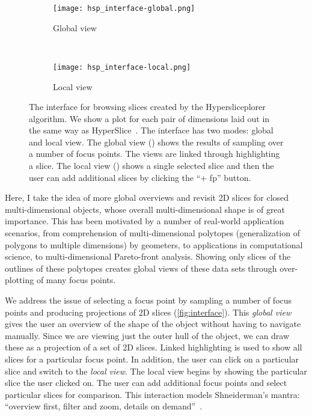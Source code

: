 


\begin{figure}[ht]
  \centering
  \begin{subfigure}[b]{0.45\linewidth}
    \texttt{[image: hsp\_interface-global.png]}
    \caption{Global view}
    \label{fig:interface:global} 
  \end{subfigure} 
  ~
  \begin{subfigure}[b]{0.45\linewidth}
    \texttt{[image: hsp\_interface-local.png]}
    \caption{Local view}
    \label{fig:interface:local} 
  \end{subfigure}
  \caption[The interface for browsing slices created by the Hypersliceplorer algorithm.]{%
    The interface for browsing slices created by the Hypersliceplorer algorithm.
    We show a plot for each pair of dimensions laid out in the same way as
    HyperSlice~\cite{Wijk:1993}.
    The interface has two modes: global and local view.
    The global view () 
    shows the results of sampling over a number of focus points. The views
    are linked through highlighting a slice. The local view 
    () shows a single selected slice and then
    the user can add additional slices by clicking the ``+ fp'' button.
  }
  \label{fig:interface}
\end{figure}

Here, I take the idea of more global overviews and revisit 2D slices
for closed multi-dimensional objects, whose overall multi-dimensional shape is
of great importance. This has been motivated by a number of real-world
application scenarios, from comprehension of multi-dimensional polytopes
(generalization of polygons to multiple dimensions) by geometers, to
applications in computational science, to multi-dimensional Pareto-front
analysis. Showing only slices of the outlines of these polytopes creates
global views of these data sets through over-plotting of many
focus points.

We address the issue of selecting a focus point by sampling a number of focus
points and producing projections of 2D slices (\autoref{fig:interface}). This
\emph{global view} gives the user an overview of the shape of the object
without having to navigate manually. Since we are viewing just
the outer hull of the object, we can draw these as a projection of a set of 2D
slices.  Linked highlighting is used to show all slices for a particular focus
point.  In addition, the user can click on a particular slice and switch to the
\emph{local view}. The local view begins by showing the particular slice the
user clicked on. The user can add additional focus points and select particular
slices for comparison. This interaction models Shneiderman's mantra: ``overview
first, filter and zoom, details on demand''~\cite{Shneiderman:1996}.

